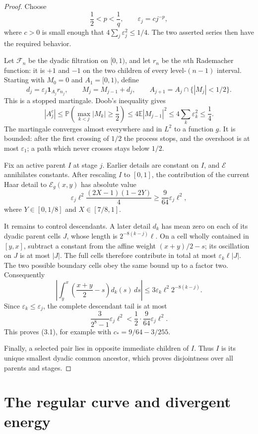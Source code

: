 \documentclass[11pt]{article}
\newcommand{\Ecal}{\mathcal E}
\begin{document}
\begin{proof}
Choose
\[
 \frac12<p<\frac1q,\qquad \varepsilon_j=cj^{-p},
\]
where $c>0$ is small enough that
$4\sum_j\varepsilon_j^2\leq1/4$.  The two asserted series then have the
required behavior.

Let $\mathcal F_n$ be the dyadic filtration on $[0,1)$, and let $r_n$ be the
$n$th Rademacher function: it is $+1$ and $-1$ on the two children of every
level-$(n-1)$ interval.  Starting with $M_0=0$ and $A_1=[0,1)$, define
\[
 d_j=\varepsilon_j\mathbf 1_{A_j}r_{n_j},\qquad
 M_j=M_{j-1}+d_j,\qquad
 A_{j+1}=A_j\cap\{|M_j|<1/2\}.
\]
This is a stopped martingale.  Doob's inequality gives
\[
 |A_j^c|
 \leq \mathbb P\!\left(\max_{k<j}|M_k|\geq\frac12\right)
 \leq4\mathbb E|M_{j-1}|^2
 \leq4\sum_k\varepsilon_k^2\leq\frac14.
\]
The martingale converges almost everywhere and in $L^2$ to a function $g$.
It is bounded: after the first crossing of $1/2$ the process stops, and the
overshoot is at most $\varepsilon_1$; a path which never crosses stays below
$1/2$.

Fix an active parent $I$ at stage $j$.  Earlier details are constant on $I$,
and $\Ecal$ annihilates constants.  After rescaling $I$ to $[0,1]$, the
contribution of the current Haar detail to $\Ecal_g(x,y)$ has absolute value
\[
 \varepsilon_j\ell^2\frac{(2X-1)(1-2Y)}4
 \geq\frac9{64}\varepsilon_j\ell^2,
 \tag{3.2}
\]
where $Y\in[0,1/8]$ and $X\in[7/8,1]$.

It remains to control descendants.  A later detail $d_k$ has mean zero on
each of its dyadic parent cells $J$, whose length is
$2^{-8(k-j)}\ell$.  On a cell wholly contained in $[y,x]$, subtract a
constant from the affine weight $(x+y)/2-s$; its oscillation on $J$ is at
most $|J|$.  The full cells therefore contribute in total at most
$\varepsilon_k\ell|J|$.  The two possible boundary cells obey the same
bound up to a factor two.  Consequently
\[
 \left|\int_y^x\left(\frac{x+y}{2}-s\right)d_k(s)\,ds\right|
 \leq3\varepsilon_k\ell^2 2^{-8(k-j)}.
\]
Since $\varepsilon_k\leq\varepsilon_j$, the complete descendant tail is at
most
\[
 \frac3{2^8-1}\varepsilon_j\ell^2
 <\frac12\cdot\frac9{64}\varepsilon_j\ell^2.
\]
This proves (3.1), for example with
$c_*=9/64-3/255$.

Finally, a selected pair lies in opposite immediate children of $I$.
Thus $I$ is its unique smallest dyadic common ancestor, which proves
disjointness over all parents and stages.
\end{proof}

\section{The regular curve and divergent energy}
\end{document}
